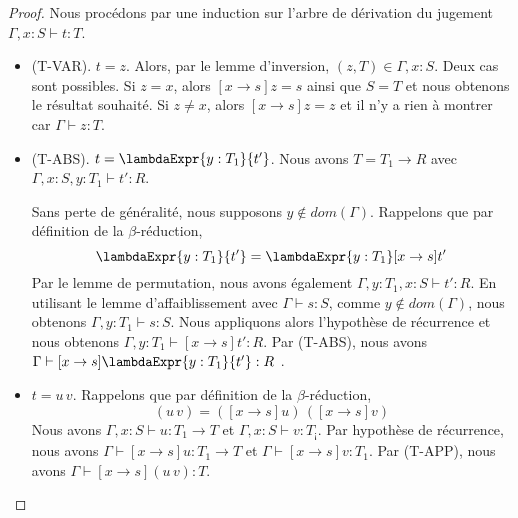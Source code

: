 \begin{proof}
  \label{proof:simply-typed-lambda-calculus-preservation-substitution}
  Nous procédons par une induction sur l'arbre de dérivation du jugement $\Gamma, x : S
  \vdash t : T$.

  \begin{itemize}
  \item (T-VAR). $t = z$. Alors, par le lemme d'inversion, $(z, T) \in \Gamma, x : S$.
    Deux cas sont possibles. Si $z = x$, alors $[x \rightarrow s] z = s$ ainsi que
    $S = T$ et nous obtenons le résultat souhaité. Si $z \neq x$,
    alors $[x \rightarrow s] z = z$ et il n'y a rien à montrer car $\Gamma
    \vdash z : T$.
  \item (T-ABS). $t = \lambdaExpr{y : T_{1}}{t'}$.
    Nous avons $T = T_{1} \rightarrow R$ avec
    $\Gamma, x : S, y : T_{1} \vdash t' : R$. 

    Sans perte de généralité, nous supposons $y \notin dom(\Gamma)$.
    Rappelons que par définition de la $\beta$-réduction,
    \begin{equation*}
      [x \rightarrow s]\lambdaExpr{y : T_{1}}{t'} = \lambdaExpr{y : T_{1}}[x \rightarrow s] t'
    \end{equation*}
    Par le lemme de permutation,
    nous avons également $\Gamma, y : T_{1}, x : S \vdash t' : R$. En utilisant le lemme
    d'affaiblissement avec $\Gamma \vdash s : S$, comme $y \notin dom(\Gamma)$,
    nous obtenons $\Gamma, y : T_{1} \vdash s : S$.
    Nous appliquons alors l'hypothèse de récurrence et nous obtenons
    $\Gamma, y : T_{1} \vdash [x \rightarrow s] t' : R$. Par (T-ABS), nous avons
    $\Gamma \vdash [x \rightarrow s] \lambdaExpr{y : T_{1}}{t'} : R$ .

    \item $t = u \, v$.
      Rappelons que par définition de la $\beta$-réduction,
      \begin{equation*}
        [x \rightarrow s](u \, v) = ([x \rightarrow s] u) \, ([x \rightarrow s] v)
      \end{equation*}
      Nous avons $\Gamma, x : S
      \vdash u : T_{1} \rightarrow T$ et $\Gamma, x : S \vdash v : T_{¡}$. Par
      hypothèse de récurrence, nous avons $\Gamma \vdash [x \rightarrow s]u :
      T_{1} \rightarrow T$ et
      $\Gamma \vdash [x \rightarrow s]v : T_{1}$. Par (T-APP), nous avons
      $\Gamma \vdash [x \rightarrow s](u \, v) : T$.
  \end{itemize}
  
\end{proof}

